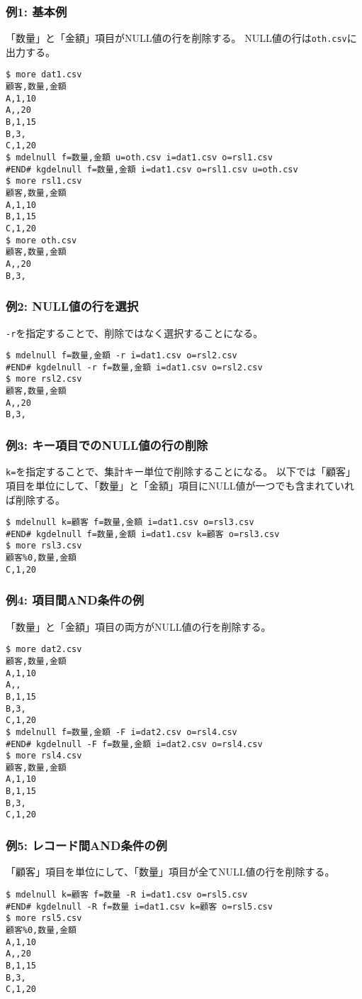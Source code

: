\subsubsection*{例1: 基本例}

「数量」と「金額」項目がNULL値の行を削除する。
NULL値の行は\verb|oth.csv|に出力する。


\begin{Verbatim}[baselinestretch=0.7,frame=single]
$ more dat1.csv
顧客,数量,金額
A,1,10
A,,20
B,1,15
B,3,
C,1,20
$ mdelnull f=数量,金額 u=oth.csv i=dat1.csv o=rsl1.csv
#END# kgdelnull f=数量,金額 i=dat1.csv o=rsl1.csv u=oth.csv
$ more rsl1.csv
顧客,数量,金額
A,1,10
B,1,15
C,1,20
$ more oth.csv
顧客,数量,金額
A,,20
B,3,
\end{Verbatim}
\subsubsection*{例2: NULL値の行を選択}

\verb|-r|を指定することで、削除ではなく選択することになる。


\begin{Verbatim}[baselinestretch=0.7,frame=single]
$ mdelnull f=数量,金額 -r i=dat1.csv o=rsl2.csv
#END# kgdelnull -r f=数量,金額 i=dat1.csv o=rsl2.csv
$ more rsl2.csv
顧客,数量,金額
A,,20
B,3,
\end{Verbatim}
\subsubsection*{例3: キー項目でのNULL値の行の削除}

\verb|k=|を指定することで、集計キー単位で削除することになる。
以下では「顧客」項目を単位にして、「数量」と「金額」項目にNULL値が一つでも含まれていれば削除する。


\begin{Verbatim}[baselinestretch=0.7,frame=single]
$ mdelnull k=顧客 f=数量,金額 i=dat1.csv o=rsl3.csv
#END# kgdelnull f=数量,金額 i=dat1.csv k=顧客 o=rsl3.csv
$ more rsl3.csv
顧客%0,数量,金額
C,1,20
\end{Verbatim}
\subsubsection*{例4: 項目間AND条件の例}

「数量」と「金額」項目の両方がNULL値の行を削除する。


\begin{Verbatim}[baselinestretch=0.7,frame=single]
$ more dat2.csv
顧客,数量,金額
A,1,10
A,,
B,1,15
B,3,
C,1,20
$ mdelnull f=数量,金額 -F i=dat2.csv o=rsl4.csv
#END# kgdelnull -F f=数量,金額 i=dat2.csv o=rsl4.csv
$ more rsl4.csv
顧客,数量,金額
A,1,10
B,1,15
B,3,
C,1,20
\end{Verbatim}
\subsubsection*{例5: レコード間AND条件の例}

「顧客」項目を単位にして、「数量」項目が全てNULL値の行を削除する。


\begin{Verbatim}[baselinestretch=0.7,frame=single]
$ mdelnull k=顧客 f=数量 -R i=dat1.csv o=rsl5.csv
#END# kgdelnull -R f=数量 i=dat1.csv k=顧客 o=rsl5.csv
$ more rsl5.csv
顧客%0,数量,金額
A,1,10
A,,20
B,1,15
B,3,
C,1,20
\end{Verbatim}
